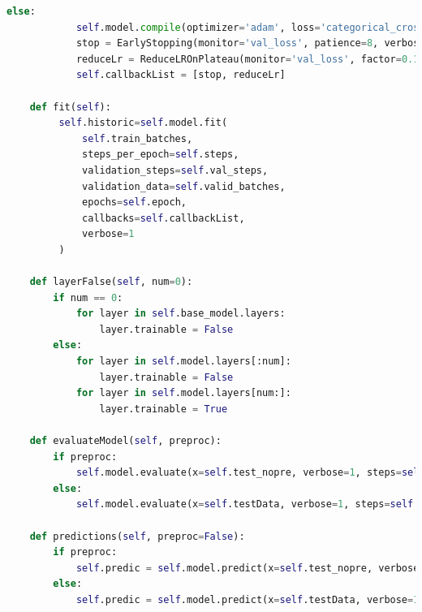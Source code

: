 ﻿\documentclass[10pt,a4paper,twocolumn,twoside]{article}
\begin{document}
\begin{lstlisting}[language=Python]
        else:
            self.model.compile(optimizer='adam', loss='categorical_crossentropy', metrics=['accuracy', 'mse'])
            stop = EarlyStopping(monitor='val_loss', patience=8, verbose=1, min_delta=1e-4)
            reduceLr = ReduceLROnPlateau(monitor='val_loss', factor=0.1, patience=3, verbose=1, min_delta=1e-4)
            self.callbackList = [stop, reduceLr]

    def fit(self):
         self.historic=self.model.fit(
             self.train_batches,
             steps_per_epoch=self.steps,
             validation_steps=self.val_steps,
             validation_data=self.valid_batches,
             epochs=self.epoch,
             callbacks=self.callbackList,
             verbose=1
         )

    def layerFalse(self, num=0):
        if num == 0:
            for layer in self.base_model.layers:
                layer.trainable = False
        else:
            for layer in self.model.layers[:num]:
                layer.trainable = False
            for layer in self.model.layers[num:]:
                layer.trainable = True

    def evaluateModel(self, preproc):
        if preproc:
            self.model.evaluate(x=self.test_nopre, verbose=1, steps=self.val_steps)
        else:
            self.model.evaluate(x=self.testData, verbose=1, steps=self.val_steps)

    def predictions(self, preproc=False):
        if preproc:
            self.predic = self.model.predict(x=self.test_nopre, verbose=1, steps=self.val_steps)
        else:
            self.predic = self.model.predict(x=self.testData, verbose=1, steps=self.val_steps)

\end{lstlisting}
\clearpage 
\end{document}
